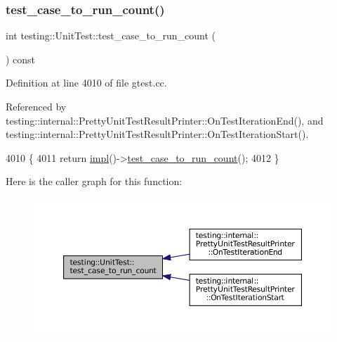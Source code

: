 \subsubsection{\texorpdfstring{test\+\_\+case\+\_\+to\+\_\+run\+\_\+count()}{test\_case\_to\_run\_count()}}
{\footnotesize\ttfamily int testing\+::\+Unit\+Test\+::test\+\_\+case\+\_\+to\+\_\+run\+\_\+count (\begin{DoxyParamCaption}{ }\end{DoxyParamCaption}) const}



Definition at line 4010 of file gtest.\+cc.



Referenced by testing\+::internal\+::\+Pretty\+Unit\+Test\+Result\+Printer\+::\+On\+Test\+Iteration\+End(), and testing\+::internal\+::\+Pretty\+Unit\+Test\+Result\+Printer\+::\+On\+Test\+Iteration\+Start().


\begin{DoxyCode}
4010                                            \{
4011   \textcolor{keywordflow}{return} \hyperlink{classtesting_1_1UnitTest_a4df5d11a58affb337d7fa62eaa07690e}{impl}()->\hyperlink{classtesting_1_1internal_1_1UnitTestImpl_aff65061646c6b9857b37097423500bfe}{test\_case\_to\_run\_count}();
4012 \}
\end{DoxyCode}
Here is the caller graph for this function\+:
\nopagebreak
\begin{figure}[H]
\begin{center}
\leavevmode
\includegraphics[width=350pt]{classtesting_1_1UnitTest_a965248fbe72f9fede5de921b6666943b_icgraph}
\end{center}
\end{figure}
\mbox{\label{classtesting_1_1UnitTest_a461f46b2976f135d2a65e8d3def746e9}} 
